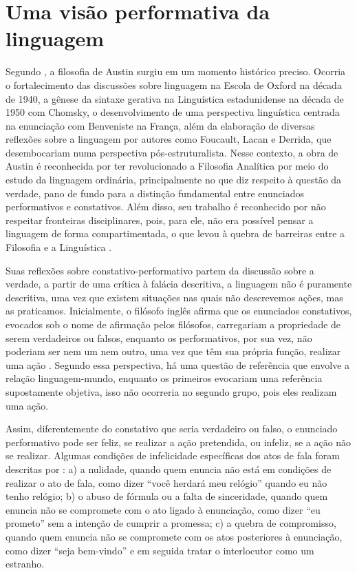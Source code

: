 \documentclass[portuguese]{textolivre}
\begin{document}
\section{Uma visão performativa da linguagem}\label{sec-normas}
Segundo \textcite{ottoni2002austin}, a filosofia de Austin surgiu em um momento histórico preciso. Ocorria o fortalecimento das discussões sobre linguagem na Escola de Oxford na década de 1940, a gênese da sintaxe gerativa na Linguística estadunidense na década de 1950 com Chomsky, o desenvolvimento de uma perspectiva linguística centrada na enunciação com Benveniste na França, além da elaboração de diversas reflexões sobre a linguagem por autores como Foucault, Lacan e Derrida, que desembocariam numa perspectiva pós-estruturalista. Nesse contexto, a obra de Austin é reconhecida por ter revolucionado a Filosofia Analítica por meio do estudo da linguagem ordinária, principalmente no que diz respeito à questão da verdade, pano de fundo para a distinção fundamental entre enunciados performativos e constativos. Além disso, seu trabalho é reconhecido por não respeitar fronteiras disciplinares, pois, para ele, não era possível pensar a linguagem de forma compartimentada, o que levou à quebra de barreiras entre a Filosofia e a Linguística \cite{ottoni2002austin}.

Suas reflexões sobre constativo-performativo partem da discussão sobre a verdade, a partir de uma crítica à falácia descritiva, a linguagem não é puramente descritiva, uma vez que existem situações nas quais não descrevemos ações, mas as praticamos. Inicialmente, o filósofo inglês afirma que os enunciados constativos, evocados sob o nome de afirmação pelos filósofos, carregariam a propriedade de serem verdadeiros ou falsos, enquanto os performativos, por sua vez, não poderiam ser nem um nem outro, uma vez que têm sua própria função, realizar uma ação \cite[p. 5–6]{austin1962how}. Segundo essa perspectiva, há uma questão de referência que envolve a relação linguagem-mundo, enquanto os primeiros evocariam uma referência supostamente objetiva, isso não ocorreria no segundo grupo, pois eles realizam uma ação.

Assim, diferentemente do constativo que seria verdadeiro ou falso, o enunciado performativo pode ser feliz, se realizar a ação pretendida, ou infeliz, se a ação não se realizar. Algumas condições de infelicidade específicas dos atos de fala foram descritas por \textcite{austin1998performativo}: a) a nulidade, quando quem enuncia não está em condições de realizar o ato de fala, como dizer “você herdará meu relógio” quando eu não tenho relógio; b) o abuso de fórmula ou a falta de sinceridade, quando quem enuncia não se compromete com o ato ligado à enunciação, como dizer “eu prometo” sem a intenção de cumprir a promessa; c) a quebra de compromisso, quando quem enuncia não se compromete com os atos posteriores à enunciação, como dizer “seja bem-vindo” e em seguida tratar o interlocutor como um estranho.
\end{document}
